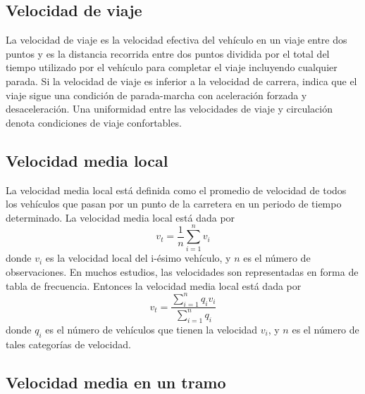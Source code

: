 \subsection{Velocidad de viaje}

La velocidad de viaje es la velocidad efectiva del vehículo en un viaje entre dos puntos y es la distancia recorrida entre dos puntos dividida por el total del tiempo utilizado por el vehículo para completar el viaje incluyendo cualquier parada. Si la velocidad de viaje es inferior a la velocidad de carrera, indica que el viaje sigue una condición de parada-marcha con aceleración forzada y desaceleración. Una uniformidad entre las velocidades de viaje y circulación denota condiciones de viaje confortables.

\subsection{Velocidad media local}

La velocidad media local está definida como el promedio de velocidad de todos los vehículos que pasan por un punto de la carretera en un periodo de tiempo determinado. La velocidad media local está dada por
\begin{equation}
{ v }_{ t }=\frac { 1 }{ n } \sum _{ i=1 }^{ n }{ { v }_{ i } }
\end{equation}
donde $v_{i}$ es la velocidad local del i-ésimo vehículo, y $n$ es el número de observaciones. En  muchos estudios, las velocidades son representadas en forma de tabla de frecuencia. Entonces la velocidad media local está dada por
\begin{equation}
{ v }_{ t }=\frac { \sum _{ i=1 }^{ n }{ { q }_{ i }{ v }_{ i } }  }{ \sum _{ i=1 }^{ n }{ { q }_{ i } }  } 
\end{equation}
donde $q_{i}$ es el número de vehículos que tienen la velocidad $v_{i}$, y $n$ es el número de tales categorías de velocidad.

\subsection{Velocidad media en un tramo}

